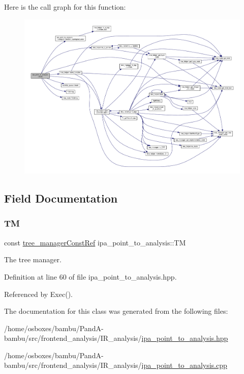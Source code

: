 Here is the call graph for this function\+:
\nopagebreak
\begin{figure}[H]
\begin{center}
\leavevmode
\includegraphics[width=350pt]{d6/d2c/classipa__point__to__analysis_a9ef230477061e15dd1550e1ca226aa79_cgraph}
\end{center}
\end{figure}


\subsection{Field Documentation}
\mbox{\label{classipa__point__to__analysis_a85c5484838931e1ea19b55d79e5e5880}} 
\subsubsection{\texorpdfstring{TM}{TM}}
{\footnotesize\ttfamily const \hyperlink{tree__manager_8hpp_a792e3f1f892d7d997a8d8a4a12e39346}{tree\+\_\+manager\+Const\+Ref} ipa\+\_\+point\+\_\+to\+\_\+analysis\+::\+TM\hspace{0.3cm}{\ttfamily [private]}}



The tree manager. 



Definition at line 60 of file ipa\+\_\+point\+\_\+to\+\_\+analysis.\+hpp.



Referenced by Exec().



The documentation for this class was generated from the following files\+:\begin{DoxyCompactItemize}
\item 
/home/osboxes/bambu/\+Pand\+A-\/bambu/src/frontend\+\_\+analysis/\+I\+R\+\_\+analysis/\hyperlink{ipa__point__to__analysis_8hpp}{ipa\+\_\+point\+\_\+to\+\_\+analysis.\+hpp}\item 
/home/osboxes/bambu/\+Pand\+A-\/bambu/src/frontend\+\_\+analysis/\+I\+R\+\_\+analysis/\hyperlink{ipa__point__to__analysis_8cpp}{ipa\+\_\+point\+\_\+to\+\_\+analysis.\+cpp}\end{DoxyCompactItemize}
